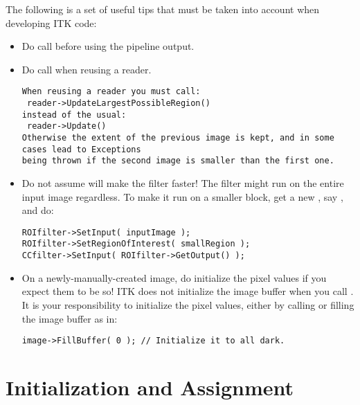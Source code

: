 The following is a set of useful tips that must be taken into account when
developing ITK code:
\begin{itemize}
\item Do call  before using the pipeline output.
\item Do call  when reusing a reader.

\small
\begin{verbatim}
When reusing a reader you must call:
 reader->UpdateLargestPossibleRegion()
instead of the usual:
 reader->Update()
Otherwise the extent of the previous image is kept, and in some cases lead to Exceptions
being thrown if the second image is smaller than the first one.
\end{verbatim}
\normalsize

\item Do not assume  will
make the filter faster! The filter might run on the entire input image
regardless. To make it run on a smaller block, get a new
, say , and do:

\small
\begin{verbatim}
ROIfilter->SetInput( inputImage );
ROIfilter->SetRegionOfInterest( smallRegion );
CCfilter->SetInput( ROIfilter->GetOutput() );
\end{verbatim}
\normalsize

\item On a newly-manually-created image, do initialize the pixel values if you
expect them to be so! ITK does not initialize the image buffer when you call
. It is your responsibility to initialize the pixel values,
either by calling  or filling the image buffer as in:

\small
\begin{verbatim}
image->FillBuffer( 0 ); // Initialize it to all dark.
\end{verbatim}
\normalsize

\end{itemize}


\section{Initialization and Assignment}
\label{sec:IniitalizationAndAssignment}

